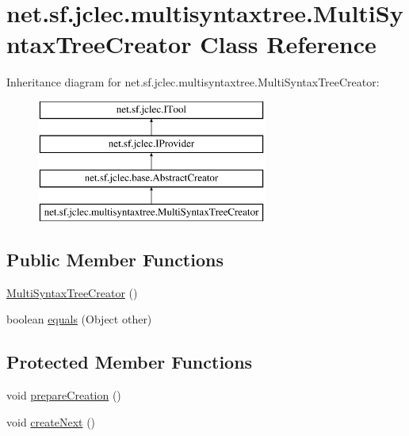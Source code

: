 \hypertarget{classnet_1_1sf_1_1jclec_1_1multisyntaxtree_1_1_multi_syntax_tree_creator}{\section{net.\-sf.\-jclec.\-multisyntaxtree.\-Multi\-Syntax\-Tree\-Creator Class Reference}
\label{classnet_1_1sf_1_1jclec_1_1multisyntaxtree_1_1_multi_syntax_tree_creator}
}
Inheritance diagram for net.\-sf.\-jclec.\-multisyntaxtree.\-Multi\-Syntax\-Tree\-Creator\-:\begin{figure}[H]
\begin{center}
\leavevmode
\includegraphics[height=4.000000cm]{classnet_1_1sf_1_1jclec_1_1multisyntaxtree_1_1_multi_syntax_tree_creator}
\end{center}
\end{figure}
\subsection*{Public Member Functions}
\begin{DoxyCompactItemize}
\item 
\hyperlink{classnet_1_1sf_1_1jclec_1_1multisyntaxtree_1_1_multi_syntax_tree_creator_a5f5b8b8cbaa9de2d78af5d67e2fb2ac1}{Multi\-Syntax\-Tree\-Creator} ()
\item 
boolean \hyperlink{classnet_1_1sf_1_1jclec_1_1multisyntaxtree_1_1_multi_syntax_tree_creator_adcf040b744ffcfd7a840fa4bdc463fe1}{equals} (Object other)
\end{DoxyCompactItemize}
\subsection*{Protected Member Functions}
\begin{DoxyCompactItemize}
\item 
void \hyperlink{classnet_1_1sf_1_1jclec_1_1multisyntaxtree_1_1_multi_syntax_tree_creator_a06e967d582acf36dc8dc39959c55e6c3}{prepare\-Creation} ()
\item 
void \hyperlink{classnet_1_1sf_1_1jclec_1_1multisyntaxtree_1_1_multi_syntax_tree_creator_a33223297fd1f40f4ef10bd1b1ec31a5a}{create\-Next} ()
\end{DoxyCompactItemize}
